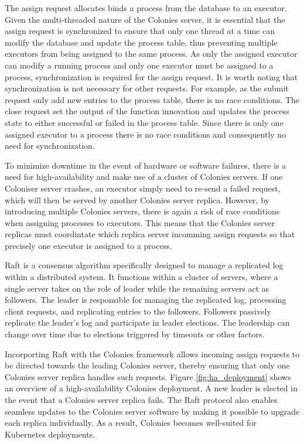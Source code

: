 \documentclass{article}
\begin{document}
The assign request allocates binds a process from the database to an executor. Given the multi-threaded nature of the Colonies server, it is essential that the assign request is synchronized to ensure that only one thread at a time can modify the database and update the process table, thus preventing multiple executors from being assigned to the same process. As only the assigned executor can modify a running process and only one executor must be assigned to a process, synchronization is required for the assign request. It is worth noting that synchronization is not necessary for other requests. For example, as the submit request only add new entries to the process table, there is no race conditions. The close request set the output of the function innovation and updates the process state to either successful or failed in the process table. Since there is only one assigned executor to a process there is no race conditions and consequently no need for synchronization.

To minimize downtime in the event of hardware or software failures, there is a need for high-availability and make use of a cluster of Colonies servers. If one Coloniser server crashes, an executor simply need to re-send a failed request, which will then be served by another Colonies server replica. However, by introducing multiple Colonies servers, there is again a risk of race conditions when assigning processes to executors. This means that the Colonies server replicas must coordintate which replica server incomming assign requests so that precisely one executor is assigned to a process.

Raft \cite{raft} is a consensus algorithm specifically designed to manage a replicated log within a distributed system. It functions within a cluster of servers, where a single server takes on the role of leader while the remaining servers act as followers. The leader is responsible for managing the replicated log, processing client requests, and replicating entries to the followers. Followers passively replicate the leader's log and participate in leader elections. The leadership can change over time due to elections triggered by timeouts or other factors.

Incorporting Raft with the Colonies framework allows incoming assign requests to be directed towards the leading Colonies server, thereby ensuring that only one Colonies server replica handles such requests. Figure \ref{fig:ha_deployment} shows an overview of a high-availability Colonies deployment. A new leader is elected in the event that a Colonies server replica fails. The Raft protocol also enables seamless updates to the Colonies server software by making it possible to upgrade each replica individually. As a result, Colonies becomes well-suited for Kubernetes deployments.
\end{document}

